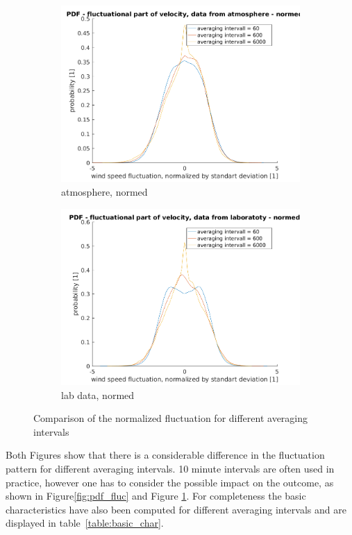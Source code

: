 \documentclass[12pt]{article}
\begin{document}
\begin{figure}[H]
\begin{subfigure}{0.5\textwidth}
  \centering
  \includegraphics[width=1\linewidth]{figures/pdf_interval_comparison_atmosphere_normed.png}
  \caption{atmosphere, normed}
\end{subfigure}
\begin{subfigure}{0.5\textwidth}
  \centering
  \includegraphics[width=1\linewidth]{figures/pdf_interval_comparison_fluc_labdata_normed.png}
  \caption{lab data, normed}
\end{subfigure}
\caption{Comparison of the normalized fluctuation for different averaging intervals}
\label{fig:pdf_fluc_normed}
\end{figure}
Both Figures show that there is a considerable difference in the fluctuation pattern for different averaging intervals. 10 minute intervals are often used in practice, however one has to consider the possible impact on the outcome, as shown in Figure\ref{fig:pdf_fluc} and Figure \ref{fig:pdf_fluc_normed}.
For completeness the basic characteristics have also been computed for different averaging intervals and are displayed in table~\ref{table:basic_char}.
\end{document}

